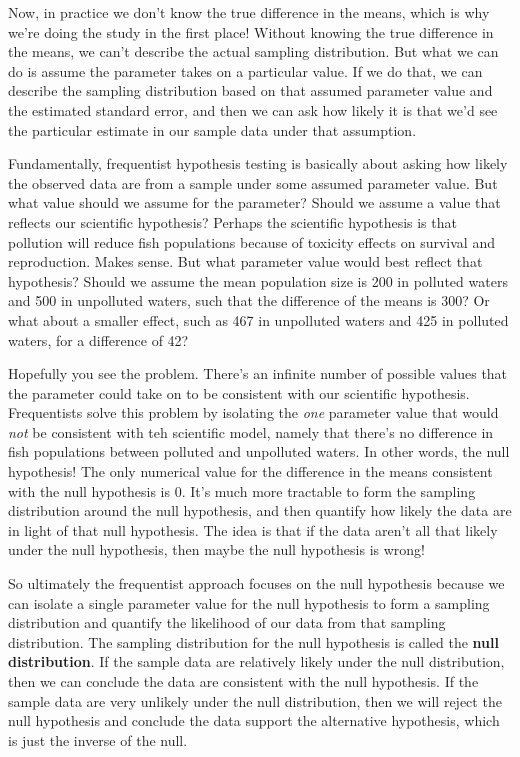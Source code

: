 \documentclass[
]{book}
\begin{document}
Now, in practice we don't know the true difference in the means, which is why we're doing the study in the first place! Without knowing the true difference in the means, we can't describe the actual sampling distribution. But what we can do is assume the parameter takes on a particular value. If we do that, we can describe the sampling distribution based on that assumed parameter value and the estimated standard error, and then we can ask how likely it is that we'd see the particular estimate in our sample data under that assumption.

Fundamentally, frequentist hypothesis testing is basically about asking how likely the observed data are from a sample under some assumed parameter value. But what value should we assume for the parameter? Should we assume a value that reflects our scientific hypothesis? Perhaps the scientific hypothesis is that pollution will reduce fish populations because of toxicity effects on survival and reproduction. Makes sense. But what parameter value would best reflect that hypothesis? Should we assume the mean population size is 200 in polluted waters and 500 in unpolluted waters, such that the difference of the means is 300? Or what about a smaller effect, such as 467 in unpolluted waters and 425 in polluted waters, for a difference of 42?

Hopefully you see the problem. There's an infinite number of possible values that the parameter could take on to be consistent with our scientific hypothesis. Frequentists solve this problem by isolating the \emph{one} parameter value that would \emph{not} be consistent with teh scientific model, namely that there's no difference in fish populations between polluted and unpolluted waters. In other words, the null hypothesis! The only numerical value for the difference in the means consistent with the null hypothesis is 0. It's much more tractable to form the sampling distribution around the null hypothesis, and then quantify how likely the data are in light of that null hypothesis. The idea is that if the data aren't all that likely under the null hypothesis, then maybe the null hypothesis is wrong!

So ultimately the frequentist approach focuses on the null hypothesis because we can isolate a single parameter value for the null hypothesis to form a sampling distribution and quantify the likelihood of our data from that sampling distribution. The sampling distribution for the null hypothesis is called the \textbf{null distribution}. If the sample data are relatively likely under the null distribution, then we can conclude the data are consistent with the null hypothesis. If the sample data are very unlikely under the null distribution, then we will reject the null hypothesis and conclude the data support the alternative hypothesis, which is just the inverse of the null.
\end{document}
